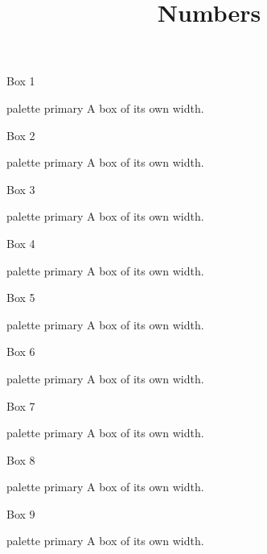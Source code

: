 \documentclass{beamer}
\title{Numbers}
\begin{document}
\begin{frame}{Box 1}
\begin{beamercolorbox}[rounded=true,shadow=true,wd=3.0cm]{palette primary}
A box of its own width.
\end{beamercolorbox}
\end{frame}
\begin{frame}{Box 2}
\begin{beamercolorbox}[rounded=true,shadow=true,wd=3.25cm]{palette primary}
A box of its own width.
\end{beamercolorbox}
\end{frame}
\begin{frame}{Box 3}
\begin{beamercolorbox}[rounded=true,shadow=true,wd=3.5cm]{palette primary}
A box of its own width.
\end{beamercolorbox}
\end{frame}
\begin{frame}{Box 4}
\begin{beamercolorbox}[rounded=true,shadow=true,wd=3.75cm]{palette primary}
A box of its own width.
\end{beamercolorbox}
\end{frame}
\begin{frame}{Box 5}
\begin{beamercolorbox}[rounded=true,shadow=true,wd=4.0cm]{palette primary}
A box of its own width.
\end{beamercolorbox}
\end{frame}
\begin{frame}{Box 6}
\begin{beamercolorbox}[rounded=true,shadow=true,wd=4.25cm]{palette primary}
A box of its own width.
\end{beamercolorbox}
\end{frame}
\begin{frame}{Box 7}
\begin{beamercolorbox}[rounded=true,shadow=true,wd=4.5cm]{palette primary}
A box of its own width.
\end{beamercolorbox}
\end{frame}
\begin{frame}{Box 8}
\begin{beamercolorbox}[rounded=true,shadow=true,wd=4.75cm]{palette primary}
A box of its own width.
\end{beamercolorbox}
\end{frame}
\begin{frame}{Box 9}
\begin{beamercolorbox}[rounded=true,shadow=true,wd=5.0cm]{palette primary}
A box of its own width.
\end{beamercolorbox}
\end{frame}
\end{document}
